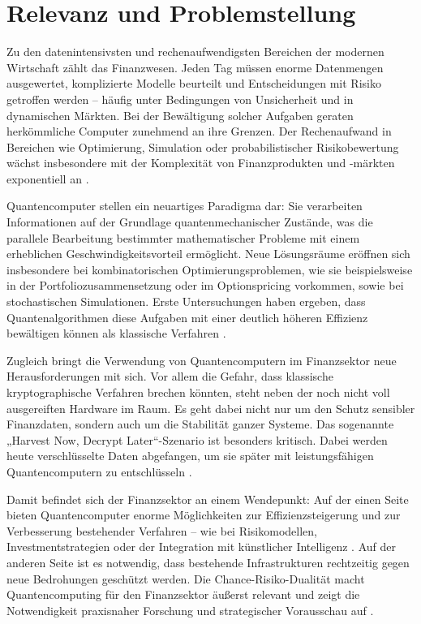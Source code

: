 \section{Relevanz und Problemstellung}
Zu den datenintensivsten und rechenaufwendigsten Bereichen der modernen Wirtschaft zählt das Finanzwesen. Jeden Tag müssen enorme Datenmengen ausgewertet, komplizierte Modelle beurteilt und Entscheidungen mit Risiko getroffen werden – häufig unter Bedingungen von Unsicherheit und in dynamischen Märkten. Bei der Bewältigung solcher Aufgaben geraten herkömmliche Computer zunehmend an ihre Grenzen. Der Rechenaufwand in Bereichen wie Optimierung, Simulation oder probabilistischer Risikobewertung wächst insbesondere mit der Komplexität von Finanzprodukten und -märkten exponentiell an \cite{springer2025,plos2024}.

Quantencomputer stellen ein neuartiges Paradigma dar: Sie verarbeiten Informationen auf der Grundlage quantenmechanischer Zustände, was die parallele Bearbeitung bestimmter mathematischer Probleme mit einem erheblichen Geschwindigkeitsvorteil ermöglicht. Neue Lösungsräume eröffnen sich insbesondere bei kombinatorischen Optimierungsproblemen, wie sie beispielsweise in der Portfoliozusammensetzung oder im Optionspricing vorkommen, sowie bei stochastischen Simulationen. Erste Untersuchungen haben ergeben, dass Quantenalgorithmen diese Aufgaben mit einer deutlich höheren Effizienz bewältigen können als klassische Verfahren \cite{quantumjournal2020,orus2019}.

Zugleich bringt die Verwendung von Quantencomputern im Finanzsektor neue Herausforderungen mit sich. Vor allem die Gefahr, dass klassische kryptographische Verfahren brechen könnten, steht neben der noch nicht voll ausgereiften Hardware im Raum. Es geht dabei nicht nur um den Schutz sensibler Finanzdaten, sondern auch um die Stabilität ganzer Systeme. Das sogenannte „Harvest Now, Decrypt Later“-Szenario ist besonders kritisch. Dabei werden heute verschlüsselte Daten abgefangen, um sie später mit leistungsfähigen Quantencomputern zu entschlüsseln \cite{finance21net}.

Damit befindet sich der Finanzsektor an einem Wendepunkt: Auf der einen Seite bieten Quantencomputer enorme Möglichkeiten zur Effizienzsteigerung und zur Verbesserung bestehender Verfahren – wie bei Risikomodellen, Investmentstrategien oder der Integration mit künstlicher Intelligenz \cite{finance21net}. Auf der anderen Seite ist es notwendig, dass bestehende Infrastrukturen rechtzeitig gegen neue Bedrohungen geschützt werden. Die Chance-Risiko-Dualität macht Quantencomputing für den Finanzsektor äußerst relevant und zeigt die Notwendigkeit praxisnaher Forschung und strategischer Vorausschau auf \cite{springer2025,orus2019}.




